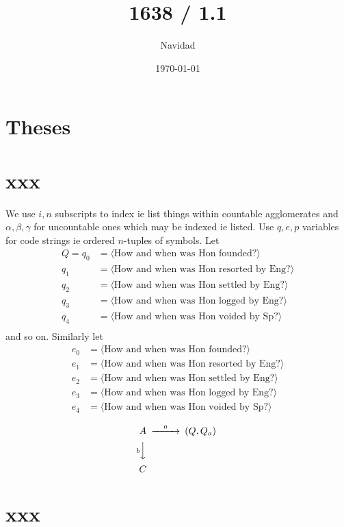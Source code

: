 \documentclass{amsart}
\title{1638 / 1.1}
\author{Navidad}
\date{\today}
\begin{document}
\maketitle
\section{Theses}
\section{xxx}
We use \(i, n\) subscripts to index ie list things within countable agglomerates and \(\alpha,\beta,\gamma\) for uncountable ones which may be indexed ie listed. Use \(q,e,p\) variables for code strings ie ordered \(n\)-tuples of symbols. Let 
\begin{align*}
Q=q_0 &= \langle\mbox{How and when was Hon founded?}\rangle\\
q_1 &= \langle\mbox{How and when was Hon resorted by Eng?}\rangle\\
q_2 &= \langle\mbox{How and when was Hon settled by Eng?}\rangle\\
q_3 &= \langle\mbox{How and when was Hon logged by Eng?}\rangle \\
q_4 &= \langle\mbox{How and when was Hon voided by Sp?}\rangle\\
\end{align*}
and so on. Similarly let
\begin{align*}
e_0 &= \langle\mbox{How and when was Hon founded?}\rangle\\
e_1 &= \langle\mbox{How and when was Hon resorted by Eng?}\rangle\\
e_2 &= \langle\mbox{How and when was Hon settled by Eng?}\rangle\\
e_3 &= \langle\mbox{How and when was Hon logged by Eng?}\rangle \\
e_4 &= \langle\mbox{How and when was Hon voided by Sp?}\rangle\\
\end{align*}
\[
\begin{CD}
A @>a>> (Q,Q_a)\\
@VbVV	\\
C
\end{CD}
\]
\section{xxx}
\end{document}
